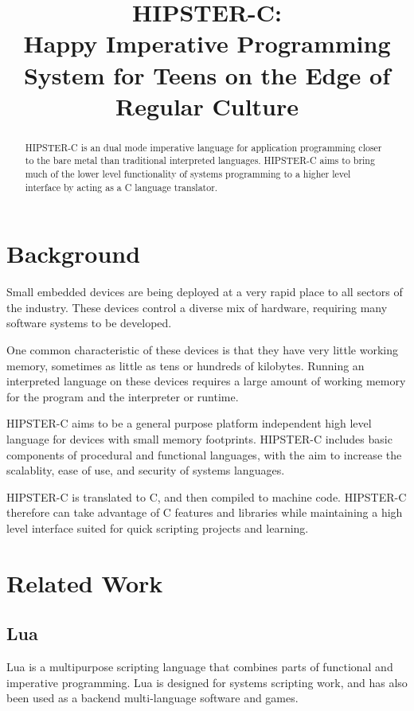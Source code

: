 \documentclass{article}
\title{HIPSTER-C:\\
       Happy Imperative Programming System for Teens on the Edge of Regular Culture}
\begin{document}
\maketitle


\begin{abstract}
  HIPSTER-C is an dual mode imperative language for application programming closer to the bare metal than traditional interpreted languages. HIPSTER-C aims to bring much of the lower level functionality of systems programming to a higher level interface by acting as a C language translator.
\end{abstract} 



\section{Background}
Small embedded devices are being deployed at a very rapid place to all sectors of the industry. These devices control a diverse mix of hardware, requiring many software systems to be developed. \par
One common characteristic of these devices is that they have very little working memory, sometimes as little as tens or hundreds of kilobytes. Running an interpreted language on these devices requires a large amount of working memory for the program and the interpreter or runtime. \par
HIPSTER-C aims to be a general purpose platform independent high level language for devices with small memory footprints. HIPSTER-C includes basic components of procedural and functional languages, with the aim to increase the scalablity, ease of use, and security of systems languages. \par 
HIPSTER-C is translated to C, and then compiled to machine code. HIPSTER-C therefore can take advantage of C features and libraries while maintaining a high level interface suited for quick scripting projects and learning. 

\section{Related Work}
\subsection{Lua}
Lua is a multipurpose scripting language that combines parts of functional and imperative programming. Lua is designed for systems scripting work, and has also been used as a backend multi-language software and games. 
\end{document}
